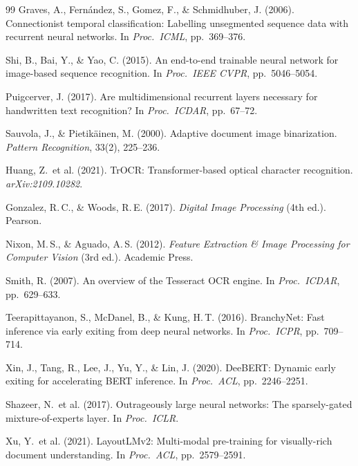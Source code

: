 \documentclass[12pt,a4paper]{article}
\begin{document}
\begin{thebibliography}{99}
   Graves, A., Fern\'{a}ndez, S.,
    Gomez, F., \& Schmidhuber, J. (2006). Connectionist temporal
    classification: Labelling unsegmented sequence data with
    recurrent neural networks. In \textit{Proc.\ ICML}, pp.\
    369--376.

   Shi, B., Bai, Y., \& Yao, C. (2015).
    An end-to-end trainable neural network for image-based sequence
    recognition. In \textit{Proc.\ IEEE CVPR}, pp.\ 5046--5054.

   Puigcerver, J. (2017). Are
    multidimensional recurrent layers necessary for handwritten text
    recognition? In \textit{Proc.\ ICDAR}, pp.\ 67--72.

   Sauvola, J., \& Pietik\"{a}inen, M.
    (2000). Adaptive document image binarization.
    \textit{Pattern Recognition}, 33(2), 225--236.

   Huang, Z.\ et al. (2021). TrOCR:
    Transformer-based optical character recognition.
    \textit{arXiv:2109.10282}.

   Gonzalez, R.\,C., \& Woods, R.\,E.
    (2017). \textit{Digital Image Processing} (4th ed.). Pearson.

   Nixon, M.\,S., \& Aguado, A.\,S.
    (2012). \textit{Feature Extraction \& Image Processing for
      Computer Vision} (3rd ed.). Academic Press.

   Smith, R. (2007). An overview of the
    Tesseract OCR engine. In \textit{Proc.\ ICDAR}, pp.\ 629--633.

   Teerapittayanon, S.,
    McDanel, B., \& Kung, H.\,T. (2016). BranchyNet: Fast inference
    via early exiting from deep neural networks. In \textit{Proc.\
      ICPR}, pp.\ 709--714.

   Xin, J., Tang, R., Lee, J., Yu, Y., \&
    Lin, J. (2020). DeeBERT: Dynamic early exiting for accelerating
    BERT inference. In \textit{Proc.\ ACL}, pp.\ 2246--2251.

   Shazeer, N.\ et al. (2017).
    Outrageously large neural networks: The sparsely-gated
    mixture-of-experts layer. In \textit{Proc.\ ICLR}.

   Xu, Y.\ et al. (2021). LayoutLMv2:
    Multi-modal pre-training for visually-rich document
    understanding. In \textit{Proc.\ ACL}, pp.\ 2579--2591.
\end{thebibliography}
\end{document}
